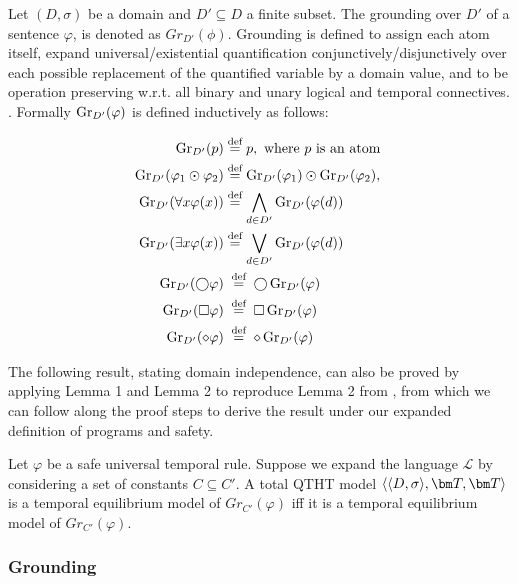 Let $(D,\sigma)$ be a domain and $D'\subseteq D$ a finite subset. The
grounding over $D'$ of a sentence $\varphi$, is denoted as
$Gr_{D'}(\phi)$. Grounding is defined to assign each atom itself,
expand universal/existential quantification
conjunctively/disjunctively over each possible replacement of the
quantified variable by a domain value, and to be operation preserving
w.r.t. all binary and unary logical and temporal
connectives. \cite{agcapevidi17a}. Formally $\operatorname{Gr}_{D^{\prime}}(\varphi)$ is defined inductively as follows:

\begin{align*}
\operatorname{Gr}_{D^{\prime}}(p) & \stackrel{\text{def}}{=} p, \text { where } p \text { is an atom } \\
\operatorname{Gr}_{D^{\prime}}(\varphi_1 \odot \varphi_2) & \stackrel{\text{def}}{=} \operatorname{Gr}_{D^{\prime}}(\varphi_1) \odot \operatorname{Gr}_{D^{\prime}}(\varphi_2), \\
\operatorname{Gr}_{D^{\prime}}(\forall x \varphi(x)) & \stackrel{\text{def}}{=} \bigwedge_{d \in D^{\prime}} \operatorname{Gr}_{D^{\prime}}(\varphi(d)) \\
\operatorname{Gr}_{D^{\prime}}(\exists x \varphi(x)) & \stackrel{\text{def}}{=} \bigvee_{d \in D^{\prime}} \operatorname{Gr}_{D^{\prime}}(\varphi(d)) \\
\operatorname{Gr}_{D^{\prime}}(\bigcirc \varphi) & \stackrel{\text { def }}{=} \bigcirc \operatorname{Gr}_{D^{\prime}}(\varphi) \\
\operatorname{Gr}_{D^{\prime}}(\square \varphi) & \stackrel{\text { def }}{=} \square \operatorname{Gr}_{D^{\prime}}(\varphi) \\
\operatorname{Gr}_{D^{\prime}}(\diamond \varphi) & \stackrel{\text { def }}{=} \diamond \operatorname{Gr}_{D^{\prime}}(\varphi)
\end{align*}

The following result, stating domain independence, can also be proved
by applying Lemma 1 and Lemma 2 to reproduce Lemma 2 from
\cite{agcapevidi17a}, from which we can follow along the proof steps
to derive the result under our expanded definition of programs and
safety.

\begin{theorem}
  Let $\varphi$ be a safe universal temporal rule. Suppose we expand
  the language $\mathcal{L}$ by considering a set of constants
  $C \subseteq C'$. A total QTHT model $\qttandt$ is a temporal
  equilibrium model of $Gr_{C'}(\varphi)$ iff it is a temporal
  equilibrium model of $Gr_{C'}(\varphi)$.
\end{theorem}

\subsubsection{Grounding}

